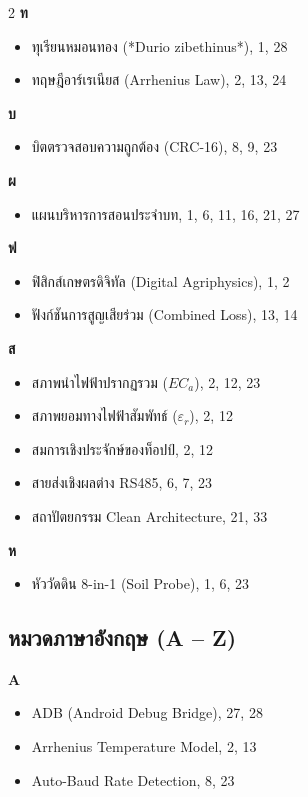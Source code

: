 \begin{multicols}{2}
\textbf{ท}
\begin{itemize}[leftmargin=1.5em, itemsep=1pt]
    \item ทุเรียนหมอนทอง (*Durio zibethinus*), 1, 28
    \item ทฤษฎีอาร์เรเนียส (Arrhenius Law), 2, 13, 24
\end{itemize}

\textbf{บ}
\begin{itemize}[leftmargin=1.5em, itemsep=1pt]
    \item บิตตรวจสอบความถูกต้อง (CRC-16), 8, 9, 23
\end{itemize}

\textbf{ผ}
\begin{itemize}[leftmargin=1.5em, itemsep=1pt]
    \item แผนบริหารการสอนประจำบท, 1, 6, 11, 16, 21, 27
\end{itemize}

\textbf{ฟ}
\begin{itemize}[leftmargin=1.5em, itemsep=1pt]
    \item ฟิสิกส์เกษตรดิจิทัล (Digital Agriphysics), 1, 2
    \item ฟังก์ชันการสูญเสียร่วม (Combined Loss), 13, 14
\end{itemize}

\textbf{ส}
\begin{itemize}[leftmargin=1.5em, itemsep=1pt]
    \item สภาพนำไฟฟ้าปรากฏรวม ($EC_a$), 2, 12, 23
    \item สภาพยอมทางไฟฟ้าสัมพัทธ์ ($\varepsilon_r$), 2, 12
    \item สมการเชิงประจักษ์ของท็อปป์, 2, 12
    \item สายส่งเชิงผลต่าง RS485, 6, 7, 23
    \item สถาปัตยกรรม Clean Architecture, 21, 33
\end{itemize}

\textbf{ห}
\begin{itemize}[leftmargin=1.5em, itemsep=1pt]
    \item หัววัดดิน 8-in-1 (Soil Probe), 1, 6, 23
\end{itemize}

\vspace{0.5cm}
\subsection*{หมวดภาษาอังกฤษ (A -- Z)}

\textbf{A}
\begin{itemize}[leftmargin=1.5em, itemsep=1pt]
    \item ADB (Android Debug Bridge), 27, 28
    \item Arrhenius Temperature Model, 2, 13
    \item Auto-Baud Rate Detection, 8, 23
\end{itemize}


\end{multicols}

